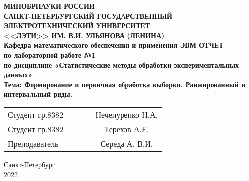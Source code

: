\begin{titlepage}

\begin{center}
\textbf{
МИНОБРНАУКИ РОССИИ \\
САНКТ-ПЕТЕРБУРГСКИЙ ГОСУДАРСТВЕННЫЙ \\
ЭЛЕКТРОТЕХНИЧЕСКИЙ УНИВЕРСИТЕТ \\
<<ЛЭТИ>> ИМ. В.И. УЛЬЯНОВА (ЛЕНИНА) \\
Кафедра математического обеспечения и применения ЭВМ
\vfill
ОТЧЕТ\\
по лабораторной работе №1\\
по дисциплине «Статистические методы обработки экспериментальных данных»\\
Тема: Формирование и первичная обработка выборки. Ранжированный и интервальный ряды.
\vfill
}
\begin{tabular}{ l c c c c }
 Студент гр.8382 & \hspace{2cm} & \underline{\hspace{4cm}} & \hspace{1cm} & Нечепуренко Н.А. \\
 Студент гр.8382 & \hspace{2cm} & \underline{\hspace{4cm}} & \hspace{1cm} & Терехов А.Е. \\
 Преподаватель & \hspace{2cm} & \underline{\hspace{4cm}} & \hspace{1cm} & Середа А.-В.И.
\end{tabular}

\vspace{3cm}

Санкт-Петербург\\
2022
\end{center}

\end{titlepage}
